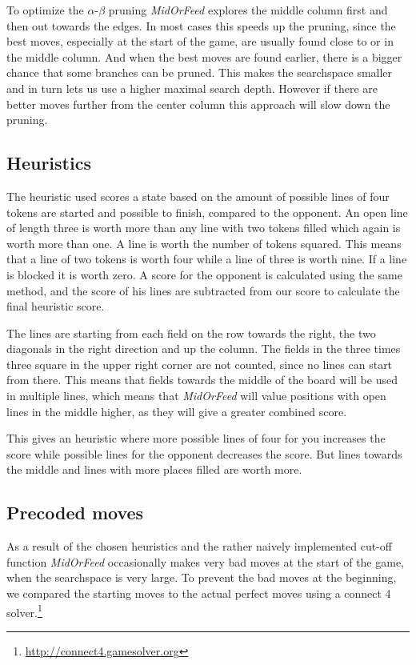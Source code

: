 To optimize the $\alpha$-$\beta$ pruning \textit{MidOrFeed} explores the middle column first and then out towards the edges. In most cases this speeds up the pruning, since the best moves, especially at the start of the game, are usually found close to or in the middle column. And when the best moves are found earlier, there is a bigger chance that some branches can be pruned. This makes the searchspace smaller and in turn lets us use a higher maximal search depth. However if there are better moves further from the center column this approach will slow down the pruning.

\subsection{Heuristics}
The heuristic used scores a state based on the amount of possible lines of four tokens are started and possible to finish, compared to the opponent. An open line of length three is worth more than any line with two tokens filled which again is worth more than one. A line is worth the number of tokens squared. This means that a line of two tokens is worth four while a line of three is worth nine. If a line is blocked it is worth zero. A score for the opponent is calculated using the same method, and the score of his lines are subtracted from our score to calculate the final heuristic score.

The lines are starting from each field on the row towards the right, the two diagonals in the right direction and up the column. The fields in the three times three square in the upper right corner are not counted, since no lines can start from there. This means that fields towards the middle of the board will be used in multiple lines, which means that \textit{MidOrFeed} will value positions with open lines in the middle higher, as they will give a greater combined score.

This gives an heuristic where more possible lines of four for you increases the score while possible lines for the opponent decreases the score. But lines towards the middle and lines with more places filled are worth more.

\subsection{Precoded moves}
As a result of the chosen heuristics and the rather naively implemented cut-off function \textit{MidOrFeed} occasionally makes very bad moves at the start of the game, when the searchspace is very large. To prevent the bad moves at the beginning, we compared the starting moves to the actual perfect moves using a connect 4 solver.\footnote{\url{http://connect4.gamesolver.org}}

